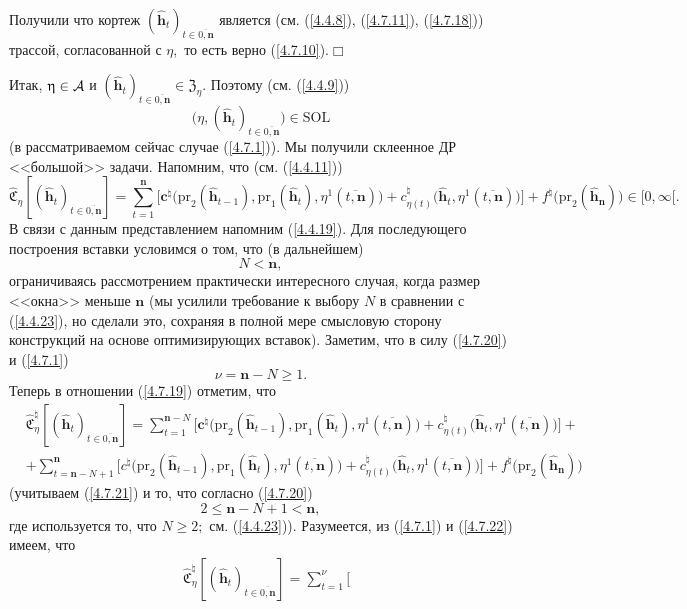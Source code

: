 \documentclass[12pt,twoside]{report}
\newcommand{\bfn}{\begin{equation}}
\newcommand{\efn}{\end{equation}}
\newcommand{\ov}{\overline}
\newcommand{\ca}{{\cal A}}
\newcommand{\zc}{{\mathbf c}}
\newcommand{\nn}{{\mathbf n}}
\begin{document}
{{Получили что кортеж $(\hat{\mathbf{h}}_t)_{t\in\ov{0,\nn}}$ является (см. (\ref{4.4.8}),
(\ref{4.7.11}), (\ref{4.7.18})) трассой, согласованной с $\eta,$ то есть
верно (\ref{4.7.10}).\hfill$\Box$

Итак, $\eta\in\ca$ и $(\hat{\mathbf{h}}_t)_{t\in\ov{0,\nn}}\in \mathfrak{Z}_\eta.$
Поэтому (см. (\ref{4.4.9}))
$$\bigl(\eta,(\hat{\mathbf{h}}_t)_{t\in\ov{0,\nn}}\bigl)\in \mathrm{SOL}
$$
(в рассматриваемом сейчас случае (\ref{4.7.1})). Мы получили склеенное ДР <<большой>>
задачи. Напомним, что (см. (\ref{4.4.11}))
\bfn\label{4.7.19}\widehat{\mathfrak{C}}_\eta[(\hat{\mathbf{h}}_t)_{t\in\ov{0,\nn}}] =
\sum\limits_{t=1}^\nn\bigl[
\zc^\natural\bigl(\mathrm{pr}_2(\hat{\mathbf{h}}_{t-1}),\mathrm{pr}_1(\hat{\mathbf{h}}_t),
\eta^1(\ov{t,\nn})\bigl)+ c_{\eta(t)}^\natural\bigl(\hat{\mathbf{h}}_t,
\eta^1(\ov{t,\nn})\bigl)\bigl] +f^\natural\bigl(\mathrm{pr}_2(\hat{\mathbf{h}}_\nn)\bigl)\in [0,\infty[.
\efn
В связи с данным представлением напомним (\ref{4.4.19}). Для последующего построения
вставки условимся о том, что (в дальнейшем)
\bfn\label{4.7.20}N < \nn,
\efn
ограничиваясь рассмотрением практически интересного случая, когда размер <<окна>>
меньше $\nn$ (мы усилили требование к выбору $N$ в сравнении с (\ref{4.4.23}), но
сделали это, сохраняя в полной мере смысловую сторону конструкций на основе
оптимизирующих вставок). Заметим, что в силу (\ref{4.7.20}) и (\ref{4.7.1})
\bfn\label{4.7.21}\nu = \nn-N \geqslant 1.
\efn
Теперь в отношении (\ref{4.7.19}) отметим, что
\begin{eqnarray}
&\widehat{\mathfrak{C}}_\eta^\natural[(\hat{\mathbf{h}}_t)_{t\in\ov{0,\nn}}] =
\sum\limits_{t=1}^{\nn-N}\bigl[
\zc^\natural\bigl(\mathrm{pr}_2(\hat{\mathbf{h}}_{t-1}),\mathrm{pr}_1(\hat{\mathbf{h}}_t),
\eta^1(\ov{t,\nn})\bigl)+ c_{\eta(t)}^\natural\bigl(\hat{\mathbf{h}}_t,\eta^1(\ov{t,\nn})\bigl)\bigl] +
&\nonumber\\
&+ \sum\limits_{t=\nn-N+1}^\nn\bigl[
c^\natural\bigl(\mathrm{pr}_2(\hat{\mathbf{h}}_{t-1}),\mathrm{pr}_1(\hat{\mathbf{h}}_t),
\eta^1(\ov{t,\nn})\bigl)+ c_{\eta(t)}^\natural\bigl(\hat{\mathbf{h}}_t,\eta^1(\ov{t,\nn})\bigl)\bigl]
+f^\natural\bigl(\mathrm{pr}_2(\hat{\mathbf{h}}_\nn)\bigl)
&\label{4.7.22}
\end{eqnarray}
(учитываем (\ref{4.7.21}) и то, что согласно (\ref{4.7.20})
$$2 \leqslant \nn -N + 1 < \nn,
$$
где используется то, что $N \geqslant 2;$ см. (\ref{4.4.23})). Разумеется, из
(\ref{4.7.1}) и (\ref{4.7.22}) имеем, что
\begin{eqnarray}
&\widehat{\mathfrak{C}}_\eta^\natural[(\hat{\mathbf{h}}_t)_{t\in\ov{0,\nn}}] = \sum\limits_{t=1}^\nu\bigl[

\end{eqnarray}}}
\end{document}
